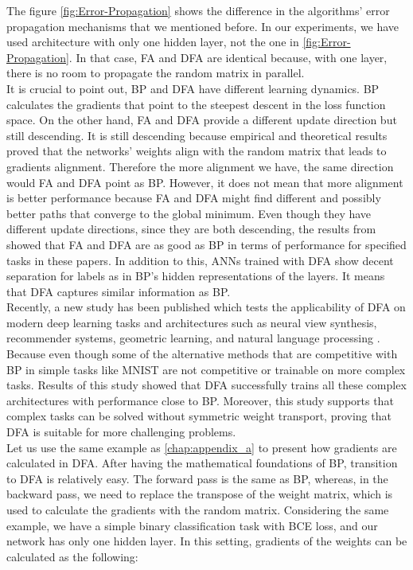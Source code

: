 \documentclass[a4paper, nobind]{templates/ociamthesis}
\begin{document}
\noindent The figure \ref{fig:Error-Propagation} shows the difference in the algorithms' error propagation mechanisms that we mentioned before. In our experiments, we have used architecture with only one hidden layer, not the one in \ref{fig:Error-Propagation}. In that case, FA and DFA are identical because, with one layer, there is no room to propagate the random matrix in parallel.\\
It is crucial to point out, BP and DFA have different learning dynamics. BP calculates the gradients that point to the steepest descent in the loss function space. On the other hand, FA and DFA provide a different update direction but still descending. It is still descending because empirical and theoretical results proved that the networks' weights align with the random matrix that leads to gradients alignment. Therefore the more alignment we have, the same direction would FA and DFA point as BP. However, it does not mean that more alignment is better performance because FA and DFA might find different and possibly better paths that converge to the global minimum. Even though they have different update directions, since they are both descending, the results from \cite{lillicrap2014random, nøkland2016direct} showed that FA and DFA are as good as BP in terms of performance for specified tasks in these papers. In addition to this, ANNs trained with DFA show decent separation for labels as in BP's hidden representations of the layers. It means that DFA captures similar information as BP.\\
Recently, a new study has been published which tests the applicability of DFA on modern deep learning tasks and architectures such as neural view synthesis, recommender systems, geometric learning, and natural language processing \cite{launay2020direct}. Because even though some of the alternative methods that are competitive with BP in simple tasks like MNIST are not competitive or trainable on more complex tasks. Results of this study showed that DFA successfully trains all these complex architectures with performance close to BP. Moreover, this study supports that complex tasks can be solved without symmetric weight transport, proving that DFA is suitable for more challenging problems.\\
Let us use the same example as \ref{chap:appendix_a} to present how gradients are calculated in DFA. After having the mathematical foundations of BP, transition to DFA is relatively easy. The forward pass is the same as BP, whereas, in the backward pass, we need to replace the transpose of the weight matrix, which is used to calculate the gradients with the random matrix. Considering the same example, we have a simple binary classification task with BCE loss, and our network has only one hidden layer. In this setting, gradients of the weights can be calculated as the following:
\end{document}
